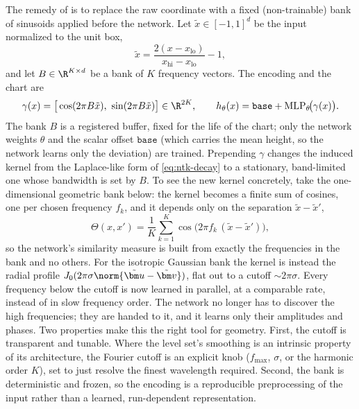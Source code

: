 The remedy of \citet{tancik2020fourier} is to replace the raw coordinate with a fixed (non-trainable) bank
of sinusoids applied before the network. Let $\tilde x\in[-1,1]^d$ be the input normalized to the unit box,
%
\begin{equation}\label{eq:normalize}
\tilde x = \frac{2(x-x_{\mathrm{lo}})}{x_{\mathrm{hi}}-x_{\mathrm{lo}}}-1,
\end{equation}
%
and let $B\in\R^{K\times d}$ be a bank of $K$ frequency vectors. The encoding and the chart are
%
\begin{equation}\label{eq:gamma}
\gamma(x)=\big[\cos(2\pi B\tilde x),\ \sin(2\pi B\tilde x)\big]\in\R^{2K},
\qquad
h_\theta(x)=\mathtt{base}+\mathrm{MLP}_\theta\!\big(\gamma(x)\big).
\end{equation}
%
The bank $B$ is a registered buffer, fixed for the life of the chart; only the network weights $\theta$ and
the scalar offset $\mathtt{base}$ (which carries the mean height, so the network learns only the deviation)
are trained. Prepending $\gamma$ changes the induced kernel from the Laplace-like form of
\eqref{eq:ntk-decay} to a stationary, band-limited one whose bandwidth is set by $B$. To see the new
kernel concretely, take the one-dimensional geometric bank below: the kernel becomes a finite sum of
cosines, one per chosen frequency $f_k$, and it depends only on the separation $\tilde x-\tilde x'$,
%
\begin{equation}\label{eq:kernel}
\Theta(x,x')=\frac1K\sum_{k=1}^{K}\cos\!\big(2\pi f_k\,(\tilde x-\tilde x')\big),
\end{equation}
%
so the network's similarity measure is built from exactly the frequencies in the bank and no others. For
the isotropic Gaussian bank the kernel is instead the radial profile $J_0(2\pi\sigma\norm{\tilde{\bm u}-\tilde{\bm
v}})$, flat out to a cutoff $\sim 2\pi\sigma$. Every frequency below the cutoff is now learned in parallel,
at a comparable rate, instead of in slow frequency order. The network no longer has to discover the high
frequencies; they are handed to it, and it learns only their amplitudes and phases. Two properties make
this the right tool for geometry. First, the cutoff is transparent and tunable. Where the level set's
smoothing is an intrinsic property of its architecture, the Fourier cutoff is an explicit knob ($f_{\max}$,
$\sigma$, or the harmonic order $K$), set to just resolve the finest wavelength required. Second, the bank
is deterministic and frozen, so the encoding is a reproducible preprocessing of the input rather than a
learned, run-dependent representation.

